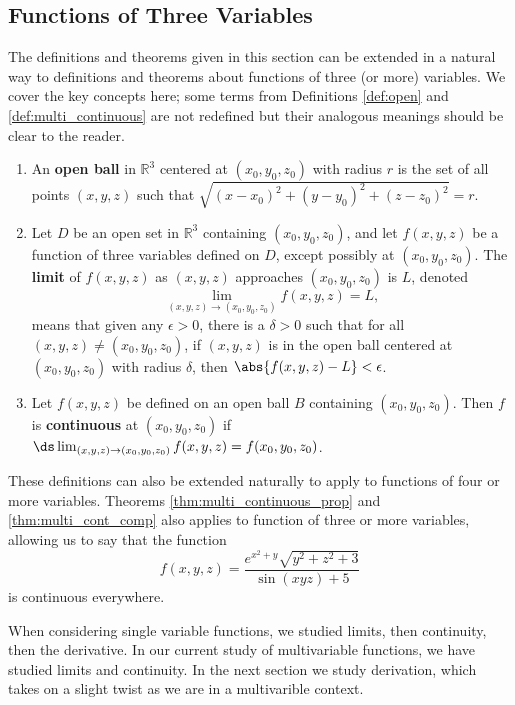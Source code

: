 \subsection{Functions of Three Variables}

The definitions and theorems given in this section can be extended in a natural way to definitions and theorems about functions of three (or more) variables. We cover the key concepts here; some terms from Definitions \ref{def:open} and \ref{def:multi_continuous} are not redefined but their analogous meanings should be clear to the reader.

\setboxwidth{20pt}
{%
\begin{enumerate}
\item An \textbf{open ball} in $\mathbb{R}^3$ centered at $(x_0,y_0,z_0)$ with radius $r$ is the set of all points $(x,y,z)$ such that $\sqrt{(x-x_0)^2+(y-y_0)^2+(z-z_0)^2} = r$.\bigskip
\item Let $D$ be an open set in $\mathbb{R}^3$ containing $(x_0,y_0,z_0)$, and let $f(x,y,z)$ be a function of three variables defined on $D$, except possibly at  $(x_0,y_0,z_0)$. The \textbf{limit} of $f(x,y,z)$ as $(x,y,z)$ approaches $(x_0,y_0,z_0)$ is $L$, denoted 
\[\lim_{(x,y,z)\to (x_0,y_0,z_0)} f(x,y,z) = L,\]
means that given any $\epsilon >0$, there is a $\delta >0$ such that for all  $(x,y,z)\neq(x_0,y_0,z_0)$, if $(x,y,z)$ is in the open ball centered at $(x_0,y_0,z_0)$ with radius $\delta$, then $\abs{f(x,y,z) - L}< \epsilon$.\bigskip
\item Let $f(x,y,z)$ be defined on an open ball $B$ containing $(x_0,y_0,z_0)$. Then $f$ is \textbf{continuous} at $(x_0,y_0,z_0)$ if $\ds \lim_{(x,y,z)\to (x_0,y_0,z_0)} f(x,y,z) = f(x_0,y_0,z_0)$.
\end{enumerate}}

These definitions can also be extended naturally to apply to functions of four or more variables. Theorems \ref{thm:multi_continuous_prop} and \ref{thm:multi_cont_comp} also applies to function of three or more variables, allowing us to say that the function
\[f(x,y,z) = \frac{e^{x^2+y}\sqrt{y^2+z^2+3}}{\sin (xyz)+5}\]
is continuous everywhere.

When considering single variable functions, we studied limits, then continuity, then the derivative. In our current study of multivariable functions, we have studied limits and continuity. In the next section we study derivation, which takes on a slight twist as we are in a multivarible context.

